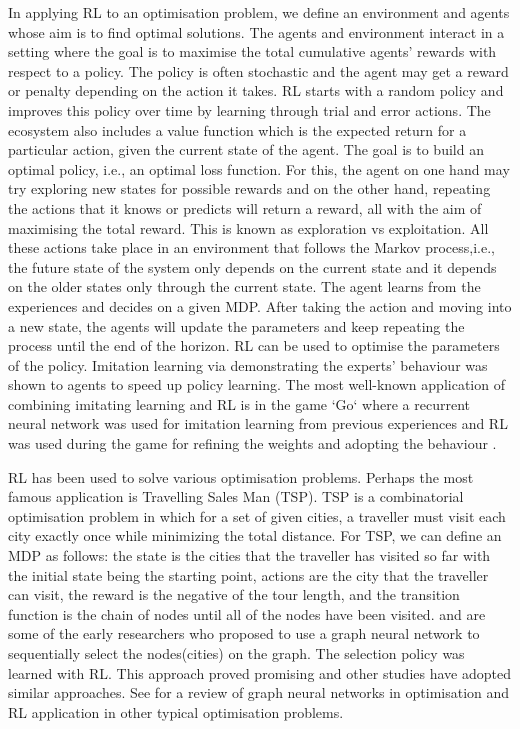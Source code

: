 \documentclass[graybox]{svmult}
\begin{document}
In applying RL to an optimisation problem, we define an environment and agents whose aim is to find optimal solutions. The agents and environment interact in a setting where the goal is to maximise the total cumulative agents' rewards with respect to a policy. The policy is often stochastic and the agent may get a reward or penalty depending on the action it takes. RL starts with a random policy and improves this policy over time by learning through trial and error actions.  The ecosystem also includes a value function which is the expected return for a particular action, given the current state of the agent. The goal is to build an optimal policy, i.e., an optimal loss function. For this, the agent on one hand may try exploring new states for possible rewards and on the other hand, repeating the actions that it knows or predicts will return a reward, all with the aim of maximising the total reward. This is known as exploration vs exploitation. All these actions take place in an environment that follows the Markov process,i.e., the future state of the system only depends on the current state and it depends on the older states only through the current state. The agent learns from the experiences and decides on a given MDP. After taking the action and moving into a new state, the agents will update the parameters and keep repeating the process until the end of the horizon. RL can be used to optimise the parameters of the policy. Imitation learning via demonstrating the experts' behaviour was shown to agents to speed up policy learning. The most well-known application of combining imitating learning and RL is in the game `Go` where a recurrent neural network was used for imitation learning from previous experiences and RL was used during the game for refining the weights and adopting the behaviour \cite{Silver2016-wn}. 

RL has been used to solve various optimisation problems. Perhaps the most famous application is Travelling Sales Man (TSP). TSP is a combinatorial optimisation problem in which for a set of given cities, a traveller must visit each city exactly once while minimizing the total distance. For TSP, we can define an MDP as follows: the state is the cities that the traveller has visited so far with the initial state being the starting point, actions are the city that the traveller can visit, the reward is the negative of the tour length, and the transition function is the chain of nodes until all of the nodes have been visited. \citet{bello2016neural} and \citet{Dai_undated-wp} are some of the early researchers who proposed to use a graph neural network to sequentially select the nodes(cities) on the graph. The selection policy was learned with RL. This approach proved promising and other studies have adopted similar approaches. See \cite{cappart2021combinatorial,Mazyavkina2021-tl} for a review of graph neural networks in optimisation and RL application in other typical optimisation problems.
\end{document}
